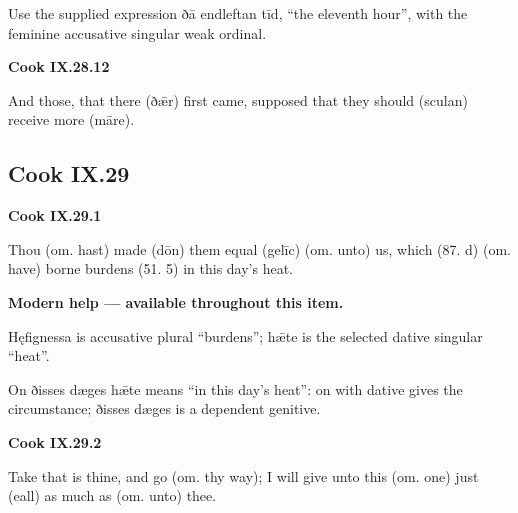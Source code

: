 Use the supplied expression ðā endleftan tīd, “the eleventh hour”, with the feminine accusative singular weak ordinal.

\par\begin{minipage}{\linewidth}\raggedright
\textbf{Cook IX.28.12}

And those, that there (ðǣr) first came, supposed that they should (sculan) receive more (māre).

\end{minipage}\par\addvspace{4pt}

\subsection*{Cook IX.29}

\par\begin{minipage}{\linewidth}\raggedright
\textbf{Cook IX.29.1}

Thou (om. hast) made (dōn) them equal (gelīc) (om. unto) us, which (87. d) (om. have) borne burdens (51. 5) in this day’s heat.

\textbf{Modern help — available throughout this item.}

\end{minipage}\par\addvspace{4pt}

Hęfignessa is accusative plural “burdens”; hǣte is the selected dative singular “heat”.

On ðisses dæges hǣte means “in this day’s heat”: on with dative gives the circumstance; ðisses dæges is a dependent genitive.

\par\begin{minipage}{\linewidth}\raggedright
\textbf{Cook IX.29.2}

Take that is thine, and go (om. thy way); I will give unto this (om. one) just (eall) as much as (om. unto) thee.

\end{minipage}\par\addvspace{4pt}

